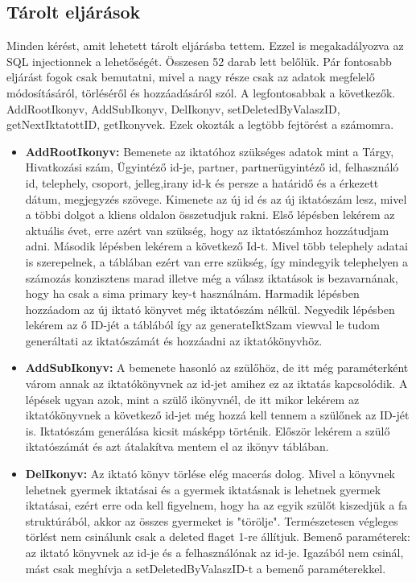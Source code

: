 \documentclass[
]{thesis-ekf}
\theoremstyle{definition}
\theoremstyle{remark}
\begin{document}
\subsection{Tárolt eljárások}
Minden kérést, amit lehetett tárolt eljárásba tettem. Ezzel is megakadályozva az SQL injectionnek a lehetőségét. Összesen 52 darab lett belőlük. Pár fontosabb eljárást fogok csak bemutatni, mivel a nagy része csak az adatok megfelelő módosításáról, törléséről és hozzáadásáról szól. A legfontosabbak a következők.
AddRootIkonyv, AddSubIkonyv, DelIkonyv, setDeletedByValaszID, getNextIktatottID, getIkonyvek. Ezek okozták a legtöbb fejtörést a számomra.
\begin{itemize}[leftmargin=0pt]
	\item[] \textbf{AddRootIkonyv: }Bemenete az iktatóhoz szükséges adatok mint a Tárgy, Hivatkozási szám, Ügyintéző id-je, partner, partnerügyintéző id, felhasználó id, telephely, csoport, jelleg,irany id-k és persze a határidő és a érkezett dátum, megjegyzés szövege. Kimenete az új id és az új iktatószám lesz, mivel a többi dolgot a kliens oldalon összetudjuk rakni. Első lépésben lekérem az aktuális évet, erre azért van szükség, hogy az iktatószámhoz hozzátudjam adni. Második lépésben lekérem a következő Id-t. Mivel több telephely adatai is szerepelnek, a táblában ezért van erre szükség, így mindegyik telephelyen a számozás konzisztens marad illetve még a válasz iktatások is bezavarnának, hogy ha csak a sima primary key-t használnám. Harmadik lépésben hozzáadom az új iktató könyvet még iktatószám nélkül. Negyedik lépésben lekérem az ő ID-jét a táblából így az generateIktSzam viewval le tudom generáltati az iktatószámát és hozzáadni az iktatókönyvhöz. 
	\item[] \textbf{AddSubIkonyv: }A bemenete hasonló az szülőhöz, de itt még paraméterként várom annak az iktatókönyvnek az id-jet amihez ez az iktatás kapcsolódik. A lépések ugyan azok, mint a szülő ikönyvnél, de itt mikor lekérem az iktatókönyvnek a következő id-jet még hozzá kell tennem a szülőnek az ID-jét is. Iktatószám generálása kicsit másképp történik. Először lekérem a szülő iktatószámát és azt átalakítva mentem el az ikönyv táblában.
	\item[] \textbf{DelIkonyv: }Az iktató könyv törlése elég macerás dolog. Mivel a könyvnek lehetnek gyermek iktatásai és a gyermek iktatásnak is lehetnek gyermek iktatásai, ezért erre oda kell figyelnem, hogy ha az egyik szülőt kiszedjük a fa struktúrából, akkor az összes gyermeket is "törölje". Természetesen végleges törlést nem csinálunk csak a deleted flaget 1-re állítjuk. Bemenő paraméterek: az iktató könyvnek az id-je és a felhasználónak az id-je. Igazából nem csinál, mást csak meghívja a setDeletedByValaszID-t a bemenő paraméterekkel.

\end{itemize}
\end{document}
